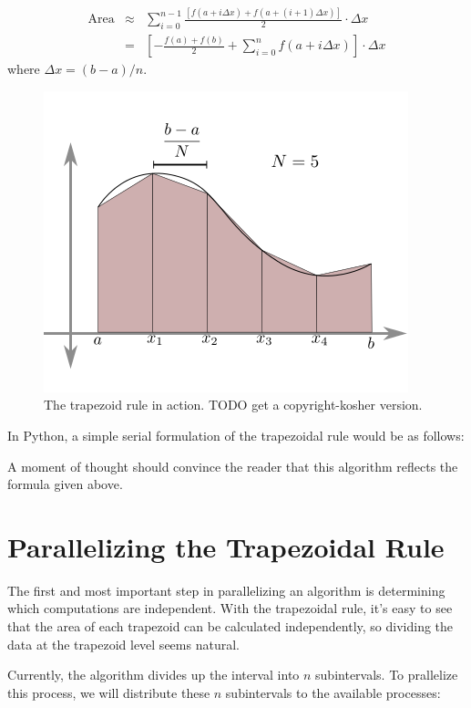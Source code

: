   \begin{eqnarray*}%
    \textrm{Area} 
    &\approx&
    \sum_{i=0}^{n-1}\frac{[f(a+i \Delta x)+f(a + (i+1) \Delta x)]}{2}\cdot\Delta x \\
    &=&
    \left[-\frac{f(a)+f(b)}{2}+\sum_{i=0}^{n}f(a+i\Delta x)\right]\cdot\Delta x
  \end{eqnarray*}
  where $\Delta x=(b-a)/n$.

  \begin{figure}[h]
  \centering
  \includegraphics[width=.5\textwidth]{TrapezoidRule.png}
  \caption{The trapezoid rule in action. TODO get a copyright-kosher version.}
  \label{fig:trapezoidal_rule}
  \end{figure}

  In Python, a simple serial formulation of the trapezoidal rule would be as follows:

  
  
  A moment of thought should convince the reader that this algorithm reflects the formula given above. 



\section*{Parallelizing the Trapezoidal Rule}
  The first and most important step in parallelizing an algorithm is determining which computations are independent. With the trapezoidal rule, it's easy to see that the area of each trapezoid can be calculated independently, so dividing the data at the trapezoid level seems natural.

  Currently, the algorithm divides up the interval into $n$ subintervals. To prallelize this process, we will distribute these $n$ subintervals to the available processes:

